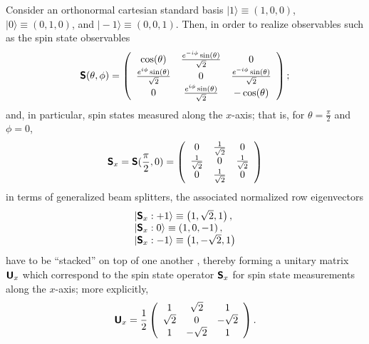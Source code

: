 \documentclass[11pt, a4paper]{article}
\theoremstyle{definition}
\begin{document}
Consider an orthonormal cartesian standard basis
$\vert 1\rangle \equiv (1,0,0)$,
$\vert 0\rangle \equiv  (0,1,0)$, and
$\vert -1\rangle \equiv  (0,0,1)$.
Then, in order to realize observables such as the spin state observables
\begin{equation}
\textsf{\textbf{S}}(\theta,\phi )
=
\left(
\begin{array}{ccc}
 \cos (\theta ) & \frac{e^{-i \phi } \sin (\theta )}{\sqrt{2}} & 0 \\
 \frac{e^{i \phi } \sin (\theta )}{\sqrt{2}} & 0 & \frac{e^{-i \phi } \sin (\theta )}{\sqrt{2}} \\
 0 & \frac{e^{i \phi } \sin (\theta )}{\sqrt{2}} & -\cos (\theta )
\end{array}
\right);
\end{equation}
and, in particular, spin states  measured along the $x$-axis;
that is, for $\theta = \frac{\pi}{2}$ and $\phi = 0$,
\begin{equation}
\textsf{\textbf{S}}_x   =
\textsf{\textbf{S}}(\frac{\pi}{2},0 )
=
\left(
\begin{array}{ccc}
 0 & \frac{1}{\sqrt{2}} & 0 \\
 \frac{1}{\sqrt{2}} & 0 & \frac{1}{\sqrt{2}} \\
 0 & \frac{1}{\sqrt{2}} & 0
\end{array}
\right)
\end{equation}
in terms of generalized beam splitters, the
associated normalized row eigenvectors
\begin{equation}
\begin{array}{l}
 \vert \textsf{\textbf{S}}_x : +1 \rangle \equiv  \left(1,\sqrt{2},1\right),\\
 \vert \textsf{\textbf{S}}_x : 0 \rangle \equiv  \left(1,0,-1\right),\\
 \vert \textsf{\textbf{S}}_x : -1 \rangle \equiv  \left(1,-\sqrt{2},1\right)
\end{array}
\end{equation}
have to be ``stacked'' on top of one another \cite{rzbb}, thereby forming a unitary matrix $\textsf{\textbf{U}}_x $
which correspond to the spin state operator $\textsf{\textbf{S}}_x$ for spin state measurements along the $x$-axis;
more explicitly,
\begin{equation}
\textsf{\textbf{U}}_x
=
\frac{1}{2}
\left(
\begin{array}{cccc}
1&\sqrt{2}&1\\
\sqrt{2}&0&-\sqrt{2}\\
1&-\sqrt{2}&1
\end{array}
\right).
\end{equation}
\end{document}
